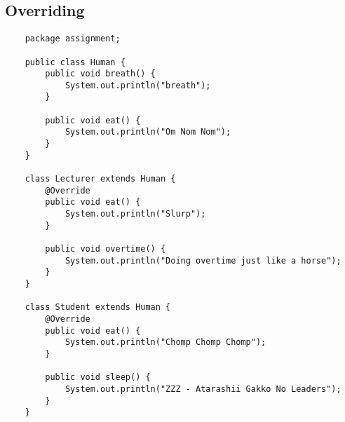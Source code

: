 \documentclass[12pt,titlepage]{article}
\begin{document}
\subsection{Overriding}
\begin{verbatim}
    package assignment;

    public class Human {
        public void breath() {
            System.out.println("breath");
        }

        public void eat() {
            System.out.println("Om Nom Nom");
        }
    }

    class Lecturer extends Human {
        @Override
        public void eat() {
            System.out.println("Slurp");
        }

        public void overtime() {
            System.out.println("Doing overtime just like a horse");
        }
    }

    class Student extends Human {
        @Override
        public void eat() {
            System.out.println("Chomp Chomp Chomp");
        }

        public void sleep() {
            System.out.println("ZZZ - Atarashii Gakko No Leaders");
        }
    }
\end{verbatim}
\end{document}
